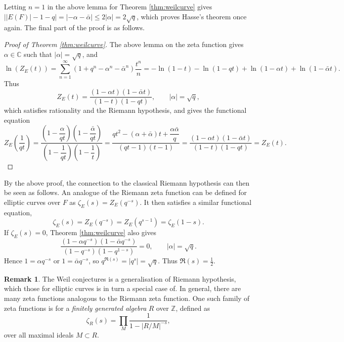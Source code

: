 \documentclass{article}
\newcommand{\Z}{\mathbb{Z}}
\newcommand{\C}{\mathbb{C}}
\newcommand{\rb}[1]{\left( #1 \right)}
\newcommand{\abs}[1]{\left\lvert #1 \right\rvert}
\theoremstyle{definition}\newtheorem*{definition}{Definition}
\theoremstyle{definition}\newtheorem*{example}{Example}
\theoremstyle{definition}\newtheorem*{remark}{Remark}
\begin{document}
Letting $ n = 1 $ in the above lemma for Theorem \ref{thm:weilcurve} gives $ \abs{\abs{E\rb{F}} - 1 - q} = \abs{-\alpha - \bar{\alpha}} \le 2\abs{\alpha} = 2\sqrt{q} $, which proves Hasse's theorem once again. The final part of the proof is as follows.

\begin{proof}[Proof of Theorem \ref{thm:weilcurve}]
The above lemma on the zeta function gives $ \alpha \in \C $ such that $ \abs{\alpha} = \sqrt{q} $, and
$$ \ln\rb{Z_E\rb{t}} = \sum_{n = 1}^\infty \rb{1 + q^n - \alpha^n - \bar{\alpha}^n}\dfrac{t^n}{n} = -\ln\rb{1 - t} - \ln\rb{1 - qt} + \ln\rb{1 - \alpha t} + \ln\rb{1 - \bar{\alpha} t}. $$
Thus
$$ Z_E\rb{t} = \dfrac{\rb{1 - \alpha t}\rb{1 - \bar{\alpha}t}}{\rb{1 - t}\rb{1 - qt}}, \qquad \abs{\alpha} = \sqrt{q}, $$
which satisfies rationality and the Riemann hypothesis, and gives the functional equation
$$ Z_E\rb{\dfrac{1}{qt}} = \dfrac{\rb{1 - \dfrac{\alpha}{qt}}\rb{1 - \dfrac{\bar{\alpha}}{qt}}}{\rb{1 - \dfrac{1}{qt}}\rb{1 - \dfrac{1}{t}}} = \dfrac{qt^2 - \rb{\alpha + \bar{\alpha}}t + \dfrac{\alpha\bar{\alpha}}{q}}{\rb{qt - 1}\rb{t - 1}} = \dfrac{\rb{1 - \alpha t}\rb{1 - \bar{\alpha}t}}{\rb{1 - t}\rb{1 - qt}} = Z_E\rb{t}. $$
\end{proof}

By the above proof, the connection to the classical Riemann hypothesis can then be seen as follows. An analogue of the Riemann zeta function can be defined for elliptic curves over $ F $ as $ \zeta_E\rb{s} = Z_E\rb{q^{-s}} $. It then satisfies a similar functional equation,
$$ \zeta_E\rb{s} = Z_E\rb{q^{-s}} = Z_E\rb{q^{s - 1}} = \zeta_E\rb{1 - s}. $$
If $ \zeta_E\rb{s} = 0 $, Theorem \ref{thm:weilcurve} also gives
$$ \dfrac{\rb{1 - \alpha q^{-s}}\rb{1 - \bar{\alpha}q^{-s}}}{\rb{1 - q^{-s}}\rb{1 - q^{1 - s}}} = 0, \qquad \abs{\alpha} = \sqrt{q}. $$
Hence $ 1 = \alpha q^{-s} $ or $ 1 = \bar{\alpha} q^{-s} $, so $ q^{\Re\rb{s}} = \abs{q^s} = \sqrt{q} $. Thus $ \Re\rb{s} = \tfrac{1}{2} $.

\begin{remark}
The Weil conjectures is a generalisation of Riemann hypothesis, which those for elliptic curves is in turn a special case of. In general, there are many zeta functions analogous to the Riemann zeta function. One such family of zeta functions is for a \emph{finitely generated algebra} $ R $ over $ \Z $, defined as
$$ \zeta_R\rb{s} = \prod_M \dfrac{1}{1 - \abs{R / M}^{-s}}, $$
over all maximal ideals $ M \subset R $.
\end{remark}
\end{document}
